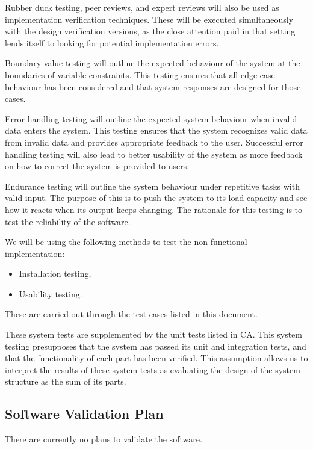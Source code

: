 \documentclass[12pt, titlepage]{article}
\begin{document}
Rubber duck testing, peer reviews, and expert reviews will also be used as 
implementation verification techniques. These will be executed simultaneously 
with the design verification versions, as the close attention paid in that 
setting lends itself to looking for potential implementation errors.

Boundary value testing will outline the expected behaviour of the system at the 
boundaries of variable constraints. This testing ensures that all edge-case 
behaviour has been considered and that system responses are designed for those 
cases.

Error handling testing will outline the expected system behaviour when invalid 
data enters the system. This testing ensures that the system recognizes valid 
data from invalid data and provides appropriate feedback to the user. 
Successful error handling testing will also lead to better usability of the 
system as more feedback on how to correct the system is provided to users.

Endurance testing will outline the system behaviour under repetitive tasks with 
valid input. The purpose of this is to push the system to its load capacity and 
see how it reacts when its output keeps changing. The rationale for this 
testing is to test the reliability of the software.

We will be using the following methods to test the non-functional 
implementation:

\begin{itemize}
	\item Installation testing,
	\item Usability testing.
\end{itemize}

These are carried out through the test cases listed in this document.

These system tests are supplemented by the unit tests listed in CA. 
This system testing presupposes that the system has passed its unit and 
integration tests, and that the functionality of each part has been verified. 
This assumption allows us to interpret the results of these system tests as 
evaluating the design of the system structure as the sum of its parts.

\subsection{Software Validation Plan}
There are currently no plans to validate the software.
\end{document}
